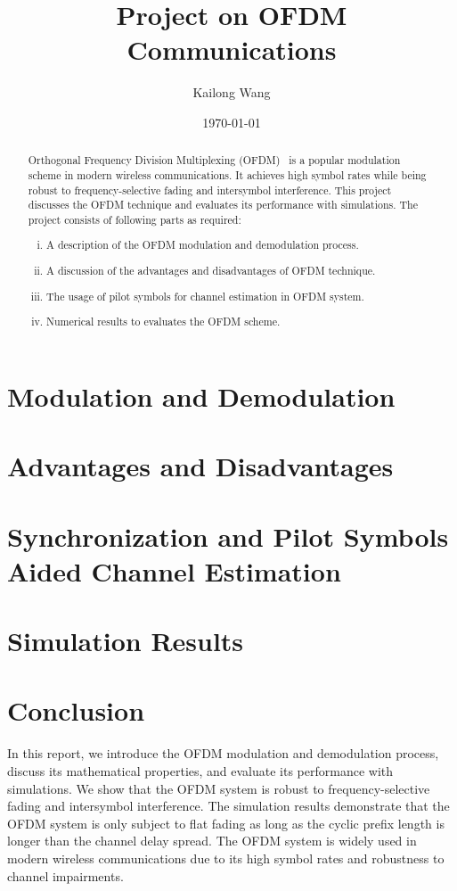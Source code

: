 \documentclass{article}
\title{Project on OFDM Communications}
\author{Kailong Wang}
\date{\today}
\theoremstyle{plain}
\theoremstyle{definition}
\theoremstyle{remark}
\begin{document}
\maketitle

\begin{abstract}
    Orthogonal Frequency Division Multiplexing (OFDM)~\cite{5307460} is a popular modulation scheme in modern wireless communications. It achieves high symbol rates while being robust to frequency-selective fading and intersymbol interference. This project discusses the OFDM technique and evaluates its performance with simulations. The project consists of following parts as required:
    \begin{enumerate}[(i)]
        \item A description of the OFDM modulation and demodulation process.
        \item A discussion of the advantages and disadvantages of OFDM technique.
        \item The usage of pilot symbols for channel estimation in OFDM system.
        \item Numerical results to evaluates the OFDM scheme.
    \end{enumerate}
\end{abstract}

\section{Modulation and Demodulation}
\label{sec:modulation}


\section{Advantages and Disadvantages}


\section{Synchronization and Pilot Symbols Aided Channel Estimation}


\section{Simulation Results}


\section{Conclusion}
In this report, we introduce the OFDM modulation and demodulation process, discuss its mathematical properties, and evaluate its performance with simulations. We show that the OFDM system is robust to frequency-selective fading and intersymbol interference. The simulation results demonstrate that the OFDM system is only subject to flat fading as long as the cyclic prefix length is longer than the channel delay spread. The OFDM system is widely used in modern wireless communications due to its high symbol rates and robustness to channel impairments.

\clearpage
\printbibliography
\end{document}
